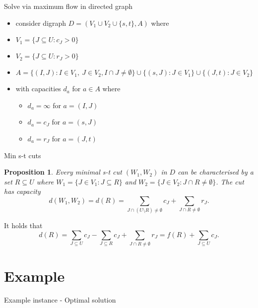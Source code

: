 \documentclass[usenames,dvipsnames]{beamer}
\newtheorem{prop}{Proposition}
\begin{document}
\begin{frame}{Solve via maximum flow in directed graph}
  \begin{itemize}
  \item consider digraph $D = (V_1 \cup V_2 \cup \{s,t\}, A)$ where
    \item $V_1 = \{J \subseteq U: c_J > 0\}$
    \item $V_2 = \{J \subseteq U: r_J > 0\}$
    \item $A = \{(I,J) : I \in V_1,~J \in V_2, I \cap J \neq
      \emptyset\} \cup \{(s, J) : J \in V_1\} \cup \{(J, t): J \in
      V_2\}$
    \item with capacities $d_a$ for $a \in A$ where
      \begin{itemize}
      \item $d_a = \infty$ for $a = (I,J)$
      \item $d_a = c_J$ for $a = (s,J)$
      \item $d_a = r_J$ for $a = (J,t)$
      \end{itemize}
  \end{itemize}
\end{frame}

\begin{frame}{Min s-t cuts}
  \begin{prop}
    Every minimal s-t cut $(W_1, W_2)$ in $D$ can be characterised by
    a set $R \subseteq U$ where $W_1 = \{J \in V_1: J \subseteq R\}$
    and $W_2 = \{J \in V_2: J \cap R \neq \emptyset\}$. The cut has
    capacity \[d(W_1, W_2) = d(R) = \sum\limits_{J \cap (U \setminus
      R) \neq \emptyset} c_J + \sum\limits_{J \cap R \neq \emptyset}
    r_J.\]
  \end{prop}
It holds that  \[d(R) = \sum\limits_{J \subseteq U} c_J - \sum\limits_{J \subseteq R} c_J + \sum\limits_{J \cap R \neq \emptyset} r_J = f(R) + \sum\limits_{J \subseteq U} c_J.\]
\end{frame}

\section{Example}
\begin{frame}[fragile]{Example instance - Optimal solution}
  \begin{minipage}{0.49\textwidth}
  
  \end{minipage}
  \begin{minipage}{0.49\textwidth}
    \begin{center}
    \end{center}
  \end{minipage}
\end{frame}
\end{document}

